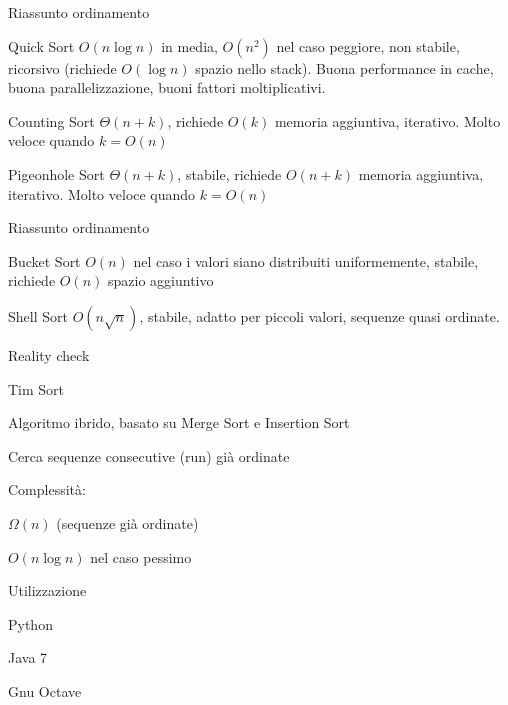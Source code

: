 \begin{frame}{Riassunto ordinamento}
\begin{block}{Quick Sort}
$O(n\log n)$ in media, $O(n^2)$ nel caso peggiore, non stabile, ricorsivo (richiede $O(\log n)$ spazio nello stack). Buona performance in cache, buona parallelizzazione, buoni fattori moltiplicativi.
\end{block}
\begin{block}{Counting Sort}
$\Theta(n+k)$, richiede $O(k)$ memoria aggiuntiva, iterativo. Molto veloce quando $k=O(n)$
\end{block}
\begin{block}{Pigeonhole Sort}
$\Theta(n+k)$, stabile, richiede $O(n+k)$ memoria aggiuntiva, iterativo. Molto veloce quando $k=O(n)$
\end{block}
\end{frame}%

\begin{frame}{Riassunto ordinamento}
\begin{block}{Bucket Sort}
$O(n)$ nel caso i valori siano distribuiti uniformemente, stabile, richiede $O(n)$ spazio aggiuntivo
\end{block}

\begin{block}{Shell Sort}
$O(n \sqrt{n})$, stabile, adatto per piccoli valori, sequenze quasi ordinate.
\end{block}

\end{frame}%

\begin{frame}{Reality check}
\begin{block}{Tim Sort}
\BI
\item Algoritmo ibrido, basato su Merge Sort e Insertion Sort
\item Cerca sequenze consecutive (run) già ordinate 
\item Complessità: 
\BI
\item $\Omega(n)$ (sequenze già ordinate)
\item $O(n \log n)$ nel caso pessimo
\EI
\EI
\end{block}

\begin{block}{Utilizzazione}
\BI
\item Python
\item Java 7
\item Gnu Octave
\EI
\end{block}

\end{frame}%



